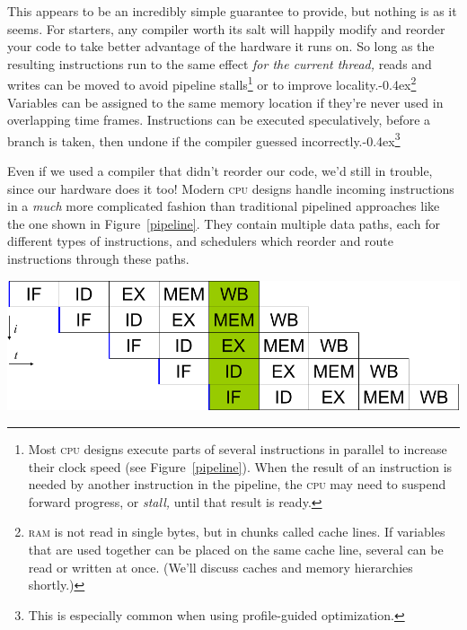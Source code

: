\documentclass[fontsize=10pt, numbers=endperiod]{scrartcl}
\newcommand{\punckern}{\kern-0.4ex}
\newcommand{\cpp}[1]{C\kern-0.1ex\raisebox{0.15ex}{\texttt{++}}{\addfontfeature{Numbers=LowercaseOff}#1}}
\newcommand{\fig}[1]{Figure~\ref{#1}}
\newcommand{\introduce}[1]{\textit{#1}}
\newenvironment{colfigure}
  {\par\vspace{1\baselineskip minus 0.5\baselineskip}\noindent\minipage{\linewidth}}
  {\endminipage\vspace*{1\baselineskip minus 0.7\baselineskip}}
\begin{document}
\begin{multicols*}{2}
This appears to be an incredibly simple guarantee to provide,
but nothing is as it seems.
For starters, any compiler worth its salt will
happily modify and reorder your code to take better advantage of the hardware
it runs on.
So long as the resulting instructions run to the same effect
\emph{for the current thread,}
reads and writes can be moved to avoid pipeline stalls\footnote{%
Most \textsc{cpu} designs execute parts of several instructions in parallel
to increase their clock speed (see \fig{pipeline}).
When the result of an instruction is needed by
another instruction in the pipeline, the \textsc{cpu} may need
to suspend forward progress, or \introduce{stall,} until that result is ready.}
or to improve locality.\punckern\footnote{%
\textsc{ram} is not read in single bytes, but in chunks called cache lines.
If variables that are used together can be placed on the same cache line,
several can be read or written at once.
(We'll discuss caches and memory hierarchies shortly.)}
Variables can be assigned to the same memory location if they're never used
in overlapping time frames.
Instructions can be executed speculatively, before a branch is taken,
then undone if the compiler guessed incorrectly.\punckern\footnote{This is
especially common when using profile-guided optimization.}

Even if we used a compiler that didn't reorder our code,
we'd still in trouble, since our hardware does it too!
Modern \textsc{cpu} designs handle incoming instructions in
a \emph{much} more complicated fashion than traditional pipelined approaches
like the one shown in \fig{pipeline}.
They contain multiple data paths, each for different types of instructions,
and schedulers which reorder and route instructions through these paths.
\begin{colfigure}
\centering
\includegraphics[keepaspectratio,width=0.7\linewidth]{pipeline}
\label{pipeline}
\end{colfigure}


\end{multicols*}
\end{document}

